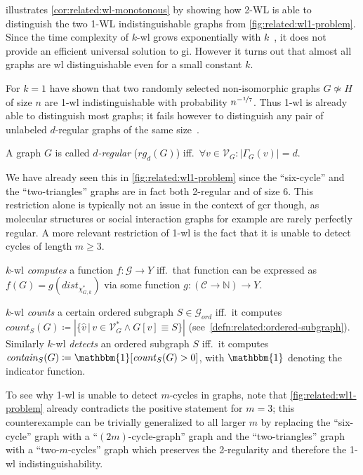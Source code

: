  illustrates \cref{cor:related:wl-monotonous} by showing how 2-WL is able to distinguish the two 1-WL indistinguishable graphs from \cref{fig:related:wl1-problem}.
Since the time complexity of $k$-\acs{wl} grows exponentially with $k$~\cite[cor.~1.9.7]{Immerman1990}, it does not provide an efficient universal solution to \ac{gi}.
However it turns out that almost all graphs are \ac{wl} distinguishable even for a small constant $k$.

For $k = 1$ \citet{Babai1980} have shown that two randomly selected non-isomorphic graphs $G \not\simeq H$ of size $n$ are 1-\acs{wl} indistinguishable with probability $n^{-\nicefrac{1}{7}}$.
Thus 1-\acs{wl} is already able to distinguish most graphs; it fails however to distinguish any pair of unlabeled $d$-regular graphs of the same size~\cite[cor.~1.8.5]{Immerman1990}.
\begin{defn}
	A graph $G$ is called \textit{$d$-regular} ($\mathit{rg}_d(G)$) iff.\ $\forall v \in \mathcal{V}_G: {|\Gamma_G(v)|} = d$.
\end{defn}
We have already seen this in \cref{fig:related:wl1-problem} since the ``six-cycle'' and the ``two-triangles'' graphs are in fact both 2-regular and of size 6.
This restriction alone is typically not an issue in the context of \ac{gcr} though, as molecular structures or social interaction graphs for example are rarely perfectly regular.
A more relevant restriction of 1-\acs{wl} is the fact that it is unable to detect cycles of length $m \geq 3$.
\begin{defn}\label{defn:related:wl-compute}
	$k$-\acs{wl} \textit{computes} a function $f: \mathcal{G} \to Y$ iff.\ that function can be expressed as $f(G) = g(\mathit{dist}_{\chi_{G, k}^{*}})$ via some function $g: (\mathcal{C} \to \mathbb{N}) \to Y$.
\end{defn}
\begin{defn}\label{defn:related:wl-count-detect}
	$k$-\acs{wl} \textit{counts} a certain ordered subgraph $S \in \mathcal{G}_{\mathit{ord}}$ iff.\ it computes $\mathit{count}_S(G) \coloneqq \left|\{ \hat{v}\, |\, v \in \mathcal{V}_G^{*} \land G[v] \equiv S \}\right|$ (see~\cref{defn:related:ordered-subgraph}).
	Similarly $k$-\acs{wl} \textit{detects} an ordered subgraph $S$ iff.\ it computes $\mathit{contain}_S(G) \coloneqq \mathbbm{1}[\mathit{count}_S(G) > 0]$, with $\mathbbm{1}$ denoting the indicator function.
\end{defn}
To see why 1-\acs{wl} is unable to detect $m$-cycles in graphs, note that \cref{fig:related:wl1-problem} already contradicts the positive statement for $m = 3$;
this counterexample can be trivially generalized to all larger $m$ by replacing the ``six-cycle'' graph with a ``$(2m)$-cycle-graph'' graph and the ``two-triangles'' graph with a ``two-$m$-cycles'' graph which preserves the 2-regularity and therefore the 1-\acs{wl} indistinguishability.

